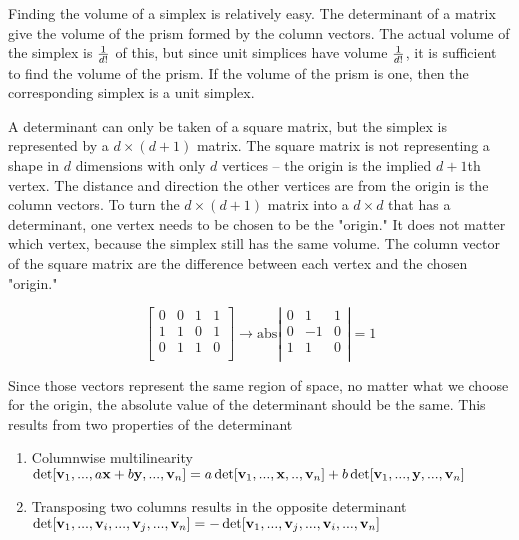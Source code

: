 \documentclass[12pt]{scrippsthesis}
\theoremstyle{definition}
\theoremstyle{remark}
\theoremstyle{plain}
\begin{document}
Finding the volume of a simplex is relatively easy.  The determinant of a matrix give the volume of the prism formed by the column vectors.  The actual volume of the simplex is ${1\over d!}$ of this, but since unit simplices have volume ${1\over d!}$, it is sufficient to find the volume of the prism.  If the volume of the prism is one, then the corresponding simplex is a unit simplex.

A determinant can only be taken of a square matrix, but the simplex is represented by a $d \times (d+1)$ matrix.  The square matrix is not representing a shape in $d$ dimensions with only $d$ vertices -- the origin is the implied $d+1$th vertex.  The distance and direction the other vertices are from the origin is the column vectors.  To turn the $d \times (d+1)$ matrix into a $d \times d$ that has a determinant, one vertex needs to be chosen to be the "origin."  It does not matter which vertex, because the simplex still has the same volume.  The column vector of the square matrix are the difference between each vertex and the chosen "origin."

\begin{equation}
\left[\begin{array}{cccc}
0 & 0 & 1 & 1\\
1 & 1 & 0 & 1\\
0 & 1 & 1 & 0\\
\end{array}\right]
\to
\text{abs}\left|\begin{array}{ccc}
 0 & 1 & 1\\
 0 & -1 & 0\\
 1 & 1 & 0\\
\end{array}\right|
=1
\end{equation}

Since those vectors represent the same region of space, no matter what we choose for the origin, the absolute value of the determinant should be the same.  This results from two properties of the determinant
\begin{enumerate}
\item Columnwise multilinearity\\
$\det[{\bf v}_1, ..., a{\bf x}+b{\bf y},...,{\bf v}_n]=
a\det[{\bf v}_1 ,..., {\bf x},..,{\bf v}_n] +
b\det[{\bf v}_1 ,..., {\bf y},...,{\bf v}_n] $
\item Transposing two columns results in the opposite determinant\\
$\det[{\bf v}_1, ...,{\bf v}_i,...,{\bf v}_j,...,{\bf v}_n]=-\det[{\bf v}_1, ...,{\bf v}_j,...,{\bf v}_i,...,{\bf v}_n]$
\end{enumerate}
\end{document}
